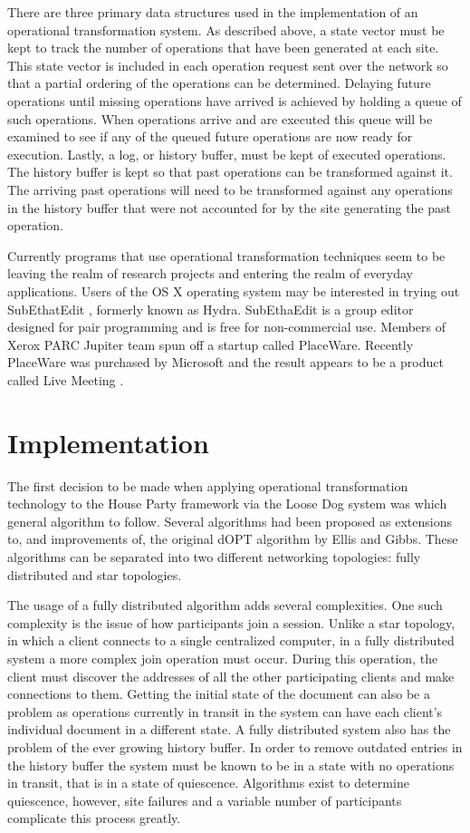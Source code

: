 \documentclass{article}
\begin{document}
There are three primary data structures used in the implementation of
an operational transformation system.  As described above, a state
vector must be kept to track the number of operations that have been
generated at each site.  This state vector is included in each
operation request sent over the network so that a partial ordering of
the operations can be determined.  Delaying future operations until
missing operations have arrived is achieved by holding a queue of
such operations.  When operations arrive and are executed this queue
will be examined to see if any of the queued future operations are now
ready for execution.  Lastly, a log, or history buffer, must be kept
of executed operations.  The history buffer is kept so that past
operations can be transformed against it.  The arriving past
operations will need to be transformed against any operations in the
history buffer that were not accounted for by the site generating the
past operation.

Currently programs that use operational transformation techniques seem
to be leaving the realm of research projects and entering the realm of
everyday applications.  Users of the OS X operating system may be
interested in trying out SubEthatEdit \cite{subetha}, formerly known
as Hydra.  SubEthaEdit is a group editor designed for pair programming
and is free for non-commercial use.  Members of Xerox PARC Jupiter
team spun off a startup called PlaceWare.  Recently PlaceWare was
purchased by Microsoft and the result appears to be a product called
Live Meeting \cite{livemeeting}.

\section{Implementation}

The first decision to be made when applying operational transformation
technology to the House Party framework via the Loose Dog system was
which general algorithm to follow.  Several algorithms had been
proposed as extensions to, and improvements of, the original dOPT
algorithm by Ellis and Gibbs.  These algorithms can be separated into
two different networking topologies: fully distributed and star
topologies.

The usage of a fully distributed algorithm adds several complexities.
One such complexity is the issue of how participants join a session.
Unlike a star topology, in which a client connects to a single
centralized computer, in a fully distributed system a more complex
join operation must occur.  During this operation, the client must
discover the addresses of all the other participating clients and make
connections to them.  Getting the initial state of the document can
also be a problem as operations currently in transit in the system can
have each client's individual document in a different state.  A fully
distributed system also has the problem of the ever growing history
buffer.  In order to remove outdated entries in the history buffer the
system must be known to be in a state with no operations in transit,
that is in a state of quiescence.  Algorithms exist to determine
quiescence, however, site failures and a variable number of
participants complicate this process greatly.
\end{document}
